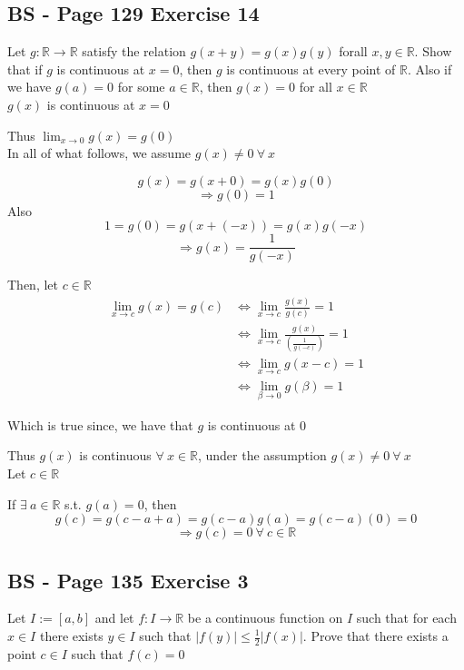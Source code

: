 \documentclass{article}
\begin{document}
\subsection*{BS - Page 129 Exercise 14}
Let \(g: \mathbb{R} \rightarrow \mathbb{R}\) satisfy the relation \(g(x+y) = g(x)g(y)\)
forall \(x,y \in \mathbb{R}\). Show that if \(g\) is continuous at \(x=0\), then \(g\) 
is continuous at every point of \(\mathbb{R}\). Also if we have \(g(a) = 0\) for some
\(a \in \mathbb{R}\), then \(g(x) = 0\) for all \(x \in \mathbb{R}\)
\\

\(g(x)\) is continuous at \(x = 0\)

Thus \(\lim_{x\to 0}{g(x)} = g(0)\)
\\

In all of what follows, we assume \(g(x) \neq 0 \ \forall \ x\) 

\[
g(x) = g(x+0) = g(x)g(0)
\]
\[
\Rightarrow g(0) = 1
\]
Also
\[
1 = g(0) = g(x + (-x)) = g(x)g(-x)
\]
\[
\Rightarrow g(x) = \frac{1}{g(-x)}
\]

Then, let \(c \in \mathbb{R}\)
\begin{align*}
    \lim_{x\to c}{g(x)} = g(c)  &\iff \lim_{x\to c}{\frac{g(x)}{g(c)}} = 1 \\
    &\iff \lim_{x\to c}{\frac{g(x)}{(\frac{1}{g(-c)})}} = 1 \\
    &\iff \lim_{x\to c}{g(x-c)} = 1 \\
    &\iff \lim_{\beta\to 0}{g(\beta)} = 1
\end{align*}

Which is true since, we have that \(g\) is continuous at \(0\)

Thus \(g(x)\) is continuous \(\forall \ x \in \mathbb{R}\), under the assumption \(g(x) \neq 0 \ \forall \ x\)
\\

Let \(c \in \mathbb{R}\)

If \(\exists \ a \in \mathbb{R}\) s.t. \(g(a) = 0\), then
\[
g(c) = g(c - a  + a) = g(c-a)g(a) = g(c-a)(0) = 0
\]
\[
\Rightarrow g(c) = 0 \ \forall \ c \in \mathbb{R}
\]


\subsection*{BS - Page 135 Exercise 3}
Let \(I := [a,b]\) and let \(f: I \rightarrow \mathbb{R}\) be a continuous function on 
\(I\) such that for each \(x \in I\) there exists \(y \in I\) such that 
\(|f(y)| \leq \frac{1}{2}|f(x)|\). Prove that there exists a point \(c \in I\) such that
\(f(c) = 0\)
\\
\end{document}
